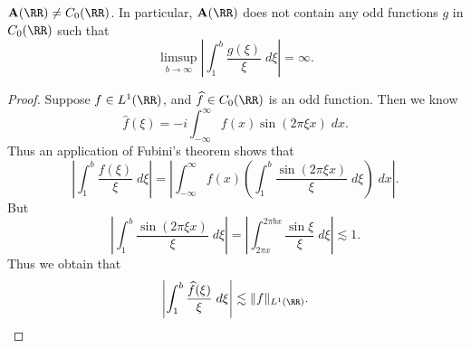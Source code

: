 \begin{theorem}
	$\mathbf{A}(\RR) \neq C_0(\RR)$. In particular, $\mathbf{A}(\RR)$ does not contain any odd functions $g$ in $C_0(\RR)$ such that
	\[ \limsup_{b \to \infty} \left| \int_1^b \frac{g(\xi)}{\xi}\; d\xi \right| = \infty. \]
\end{theorem}
\begin{proof}
	Suppose $f \in L^1(\RR)$, and $\widehat{f} \in C_0(\RR)$ is an odd function. Then we know
	\[ \widehat{f}(\xi) = -i \int_{-\infty}^\infty f(x) \sin(2 \pi \xi x)\; dx. \]
	Thus an application of Fubini's theorem shows that
	\[ \left| \int_1^b \frac{\widehat{f}(\xi)}{\xi}\; d\xi \right| = \left| \int_{-\infty}^\infty f(x) \left( \int_1^b \frac{\sin(2 \pi \xi x)}{\xi}\; d\xi \right)\; dx \right|. \]
	But
	\[ \left| \int_1^b \frac{\sin(2 \pi \xi x)}{\xi}\; d\xi \right| = \left| \int_{2 \pi x}^{2 \pi b x} \frac{\sin \xi}{\xi}\; d\xi \right| \lesssim 1. \]
	Thus we obtain that
	\[ \left| \int_1^b \frac{\widehat{f}(\xi)}{\xi}\; d\xi \right| \lesssim \| f \|_{L^1(\RR)}. \qedhere \]
\end{proof}

